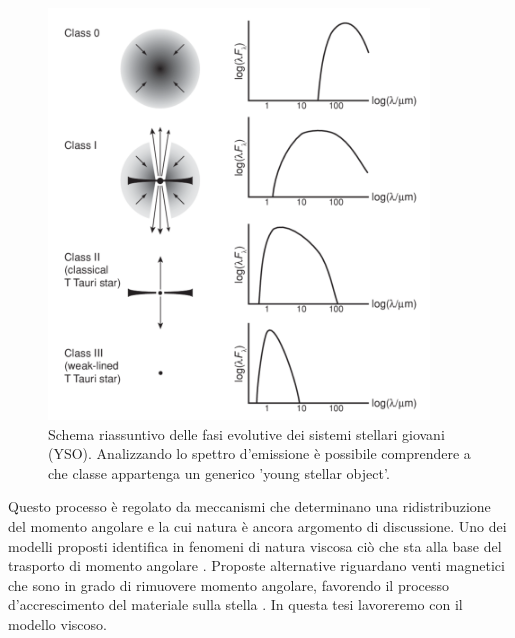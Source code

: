 \begin{figure}[H]
  \centering
  \includegraphics[width=0.9\textwidth]{Immagini/IntroTeorica/YSO.png}
  \caption{Schema riassuntivo delle fasi evolutive dei sistemi stellari giovani (YSO). Analizzando lo spettro d'emissione è possibile comprendere a che classe appartenga un generico 'young stellar object'.}
  \label{fig:YS0}
\end{figure}

Questo processo è regolato da meccanismi che determinano una ridistribuzione del momento angolare e la cui natura è ancora argomento di discussione. 
Uno dei modelli proposti identifica in fenomeni di natura viscosa ciò che sta alla base del trasporto di momento angolare \parencite{BellPringle1974}. Proposte alternative riguardano venti magnetici che sono in grado di rimuovere momento angolare, favorendo il processo d'accrescimento del materiale sulla stella \parencite{MagneticWinds}. In questa tesi lavoreremo con il modello viscoso.


